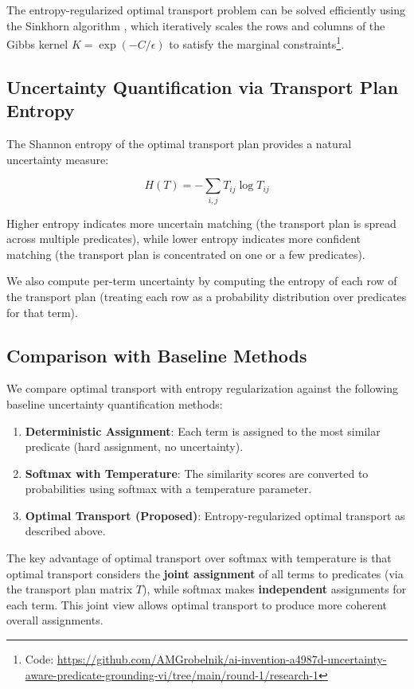 \documentclass[11pt,letterpaper]{article}
\begin{document}
The entropy-regularized optimal transport problem can be solved efficiently using the Sinkhorn algorithm \cite{Cuturi2013, Peyre2019}, which iteratively scales the rows and columns of the Gibbs kernel $K = \exp(-C/\epsilon)$ to satisfy the marginal constraints\footnote{Code: \url{https://github.com/AMGrobelnik/ai-invention-a4987d-uncertainty-aware-predicate-grounding-vi/tree/main/round-1/research-1}}.

\subsection{Uncertainty Quantification via Transport Plan Entropy}

The Shannon entropy of the optimal transport plan provides a natural uncertainty measure:

\begin{equation}
H(T) = -\sum_{i,j} T_{ij} \log T_{ij}
\end{equation}

Higher entropy indicates more uncertain matching (the transport plan is spread across multiple predicates), while lower entropy indicates more confident matching (the transport plan is concentrated on one or a few predicates).

We also compute per-term uncertainty by computing the entropy of each row of the transport plan (treating each row as a probability distribution over predicates for that term).

\subsection{Comparison with Baseline Methods}

We compare optimal transport with entropy regularization against the following baseline uncertainty quantification methods:

\begin{enumerate}
\item \textbf{Deterministic Assignment}: Each term is assigned to the most similar predicate (hard assignment, no uncertainty).
\item \textbf{Softmax with Temperature}: The similarity scores are converted to probabilities using softmax with a temperature parameter.
\item \textbf{Optimal Transport (Proposed)}: Entropy-regularized optimal transport as described above.
\end{enumerate}

The key advantage of optimal transport over softmax with temperature is that optimal transport considers the \textbf{joint assignment} of all terms to predicates (via the transport plan matrix $T$), while softmax makes \textbf{independent} assignments for each term. This joint view allows optimal transport to produce more coherent overall assignments.
\end{document}
